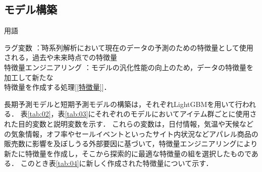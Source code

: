 \documentclass[dvipdfmx]{jreport}
\begin{document}
\subsection{モデル構築}
\begin{itembox}[l]{\large{用語}}
    \begin{tabbing}
        \hspace{15pt} \raisebox{0.5ex}{\tiny $\bullet$} ラグ変数 \hspace{68pt}\=：時系列解析において現在のデータの予測のための特徴量として使用\\[0.5em]\>\hspace{6.5pt}される，過去や未来時点での特徴量\\[0.5em]
        \hspace{15pt} \raisebox{0.5ex}{\tiny $\bullet$} 特徴量エンジニアリング \>：モデルの汎化性能の向上のため，データの特徴量を加工して新たな\\[0.5em]\>\hspace{6.5pt}特徴量を作成する処理[\ref{特徴量}]．
    \end{tabbing}
\end{itembox}

長期予測モデルと短期予測モデルの構築は，それぞれLightGBMを用いて行われる．
表\ref{tab:02}，表\ref{tab:03}にそれぞれのモデルにおいてアイテム群ごとに使用された目的変数と説明変数を示す．
これらの変数は，日付情報，気温や天候などの気象情報，オフ率やセールイベントといったサイト内状況などアパレル商品の販売数に影響を及ぼしうる外部要因に基づいて，特徴量エンジニアリングにより新たに特徴量を作成し，そこから探索的に最適な特徴量の組を選択したものである．
このとき表\ref{tab:04}に新しく作成された特徴量について示す．

\end{document}
